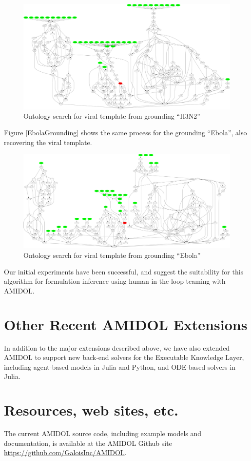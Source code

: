\documentclass[11pt]{article}
\theoremstyle{definition}
\newcommand{\amidol}{\textsc{AMIDOL}}
\begin{document}
\begin{figure}
  \includegraphics[width=\textwidth]{H3N2map.png}
  \caption{Ontology search for viral template from grounding ``H3N2''}
  \label{Fig:H3N2Grounding}
\end{figure}

Figure \ref{EbolaGrounding} shows the same process for the grounding
``Ebola'', also recovering the viral template.

\begin{figure}
  \includegraphics[width=\textwidth]{Ebolamap.png}
  \caption{Ontology search for viral template from grounding
    ``Ebola''}
  \label{Fig:EbolaGrounding}
\end{figure}

Our initial experiments have been successful, and suggest the
suitability for this algorithm for formulation inference using
human-in-the-loop teaming with \amidol{}.

\section{Other Recent AMIDOL Extensions}

In addition to the major extensions described above, we have also
extended \amidol{} to support new back-end solvers for the Executable
Knowledge Layer, including agent-based models in Julia and Python, and
ODE-based solvers in Julia.

\section{Resources, web sites, etc.}

The current \amidol{} source code, including example models and documentation, is available at the \amidol{} Github site \url{https://github.com/GaloisInc/AMIDOL}.


\end{document}
